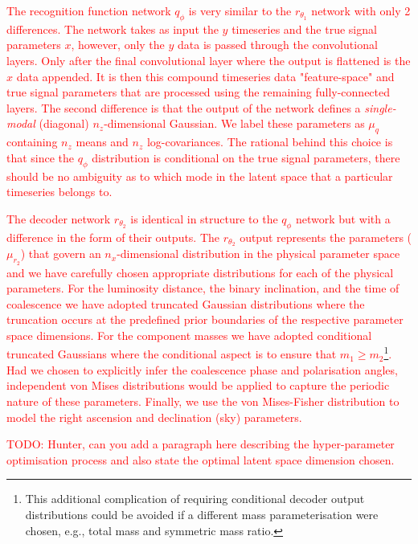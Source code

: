 \documentclass[%
showpacs,
nofootinbib,
 amsmath,amssymb,
 aps,
 twocolumn,
 prl,
 reprint,
floatfix,
]{revtex4-1}
\newcommand{\new}[1]{\textcolor{red}{#1}}
\begin{document}
%
% 
\new{The recognition function network $q_{\phi}$ is very similar to the
$r_{\theta_1}$ network with only 2 differences. The network takes as input the
$y$ timeseries and the true signal parameters $x$, however, only the $y$ data
is passed through the convolutional layers. Only after the final convolutional
layer where the output is flattened is the $x$ data appended. It is then this
compound timeseries data "feature-space" and true signal parameters that are
processed using the remaining fully-connected layers. The second difference is
that the output of the network defines a \emph{single-modal} (diagonal)
$n_z$-dimensional Gaussian. We label these parameters as $\mu_{q}$ containing
$n_z$ means and $n_z$ log-covariances. The rational behind this choice is that
since the $q_{\phi}$ distribution is conditional on the true signal parameters,
there should be no ambiguity as to which mode in the latent space that a
particular timeseries belongs to.}      

%
%
\new{The decoder network $r_{\theta_2}$ is identical in structure to the
$q_{\phi}$ network but with a difference in the form of their outputs. The
$r_{\theta_2}$ output represents the parameters ($\mu_{r_2}$) that govern an
$n_x$-dimensional distribution in the physical parameter space and we have
carefully chosen appropriate distributions for each of the physical parameters.
For the luminosity distance, the binary inclination, and the time of
coalescence we have adopted truncated Gaussian distributions where the
truncation occurs at the predefined prior boundaries of the respective
parameter space dimensions. For the component masses we have adopted
conditional truncated Gaussians where the conditional aspect is to ensure that
$m_{1}\geq m_{2}$\footnote{This additional complication of requiring conditional
decoder output distributions could be avoided if a different mass
parameterisation were chosen, e.g., total mass and symmetric mass ratio.}. Had
we chosen to explicitly infer the coalescence phase and polarisation angles,
independent von Mises distributions would be applied to capture the periodic
nature of these parameters. Finally, we use the von Mises-Fisher distribution
to model the right ascension and declination (sky) parameters.}     

%
%
\new{TODO: Hunter, can you add a paragraph here describing the hyper-parameter
optimisation process and also state the optimal latent space dimension chosen.}
\end{document}
